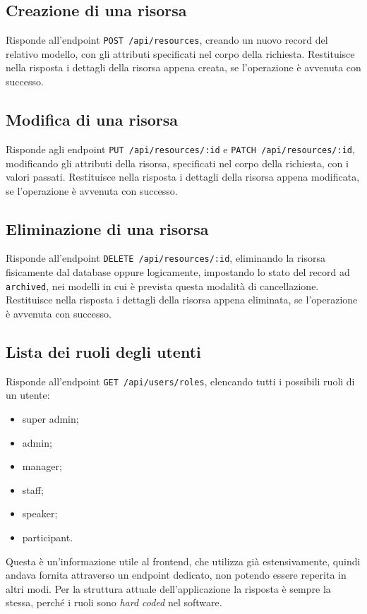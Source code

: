 \subsection{Creazione di una risorsa} \label{api:create-route}
Risponde all'endpoint \verb|POST /api/resources|, creando un nuovo record del relativo modello, con gli attributi specificati nel corpo della richiesta. Restituisce nella risposta i dettagli della risorsa appena creata, se l'operazione è avvenuta con successo.

\subsection{Modifica di una risorsa}
Risponde agli endpoint \verb|PUT /api/resources/:id| e \verb|PATCH /api/resources/:id|, modificando gli attributi della risorsa, specificati nel corpo della richiesta, con i valori passati. Restituisce nella risposta i dettagli della risorsa appena modificata, se l'operazione è avvenuta con successo.

\subsection{Eliminazione di una risorsa}
Risponde all'endpoint \verb|DELETE /api/resources/:id|, eliminando la risorsa fisicamente dal database oppure logicamente, impostando lo stato del record ad \verb|archived|, nei modelli in cui è prevista questa modalità di cancellazione. Restituisce nella risposta i dettagli della risorsa appena eliminata, se l'operazione è avvenuta con successo.

\subsection{Lista dei ruoli degli utenti}
Risponde all'endpoint \verb|GET /api/users/roles|, elencando tutti i possibili ruoli di un utente:
\begin{itemize}
	\item super admin;
	\item admin;
	\item manager;
	\item staff;
	\item speaker;
	\item participant.
\end{itemize}
Questa è un'informazione utile al frontend, che utilizza già estensivamente, quindi andava fornita attraverso un endpoint dedicato, non potendo essere reperita in altri modi. Per la struttura attuale dell'applicazione la risposta è sempre la stessa, perché i ruoli sono \emph{hard coded} nel software.

